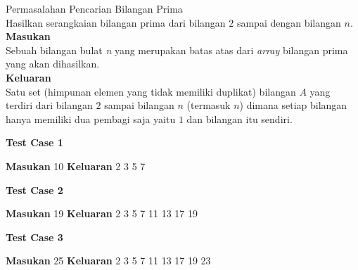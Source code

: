 \newpage
\begin{permasalahan}{Permasalahan Pencarian Bilangan Prima}\\
	Hasilkan serangkaian bilangan prima dari bilangan $2$ sampai dengan bilangan $n$.\\
	\textbf{Masukan}\\
	Sebuah bilangan bulat \textit{n} yang merupakan batas atas dari \textit{array} bilangan prima yang akan dihasilkan.\\
	\textbf{Keluaran}\\
	Satu set (himpunan elemen yang tidak memiliki duplikat) bilangan $A$ yang terdiri dari bilangan $2$ sampai bilangan $n$ (termasuk $n$) dimana setiap bilangan hanya memiliki dua pembagi saja yaitu $1$ dan bilangan itu sendiri.\\
	\begin{center}
	\textbf{Test Case 1}
	\end{center}
	\textbf{Masukan}
	10
	\textbf{Keluaran}
	2 3 5 7
	\begin{center}
	\textbf{Test Case 2}
	\end{center}
	\textbf{Masukan}
	19
	\textbf{Keluaran}
	2 3 5 7 11 13 17 19
	\begin{center}
	\textbf{Test Case 3}
	\end{center}
	\textbf{Masukan}
	25
	\textbf{Keluaran}
	2 3 5 7 11 13 17 19 23 
\end{permasalahan}


